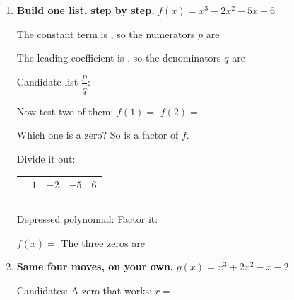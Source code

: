\documentclass[10pt]{article}
\begin{document}
\begin{tcolorbox}[colback=white, colframe=black!40, title=\textbf{Tier R --- Remediate},
    fonttitle=\bfseries, arc=1.5mm, left=3mm, right=3mm, top=2mm, bottom=2mm, breakable]
\begin{enumerate}[leftmargin=1.7em, itemsep=9pt]
  \item \textbf{Build one list, step by step.} $f(x) = x^3 - 2x^2 - 5x + 6$

    \vspace{2pt}
    The constant term is \blank{1.0cm}, so the numerators $p$ are \blank{3.6cm}

    \vspace{2pt}
    The leading coefficient is \blank{1.0cm}, so the denominators $q$ are \blank{2.0cm}

    \vspace{2pt}
    Candidate list $\dfrac{p}{q}$: \blank{5.4cm}

    \vspace{3pt}
    Now test two of them: \; $f(1) = $ \blank{1.4cm} \qquad $f(2) = $ \blank{1.4cm}

    \vspace{2pt}
    Which one is a zero? \blank{1.2cm} \; So \blank{1.8cm} is a factor of $f$.

    \vspace{3pt}
    Divide it out:
    \begin{center}
    \renewcommand{\arraystretch}{1.6}
    \begin{tabular}{r|C{1.4cm}C{1.4cm}C{1.4cm}C{1.4cm}}
        & $1$ & $-2$ & $-5$ & $6$ \\
        &     &      &      &     \\ 
        &     &      &      &     \\
    \end{tabular}
    \end{center}

    \vspace{2pt}
    Depressed polynomial: \blank{2.8cm} \; Factor it: \blank{3.0cm}

    \vspace{2pt}
    $f(x) = $ \blank{4.6cm} \qquad The three zeros are \blank{3.4cm}

  \item \textbf{Same four moves, on your own.} $g(x) = x^3 + 2x^2 - x - 2$

    \vspace{2pt}
    Candidates: \blank{4.0cm} \qquad A zero that works: $r = $ \blank{1.0cm}


\end{enumerate}
\end{tcolorbox}
\end{document}
